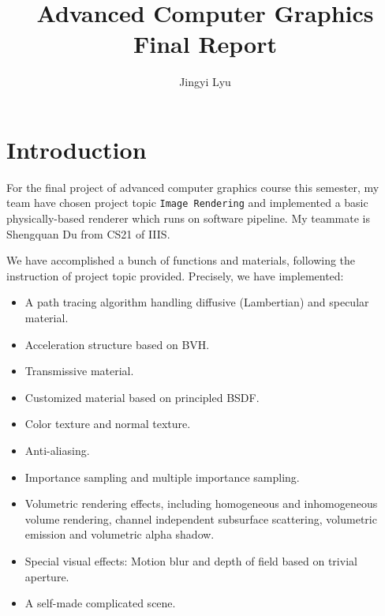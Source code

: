 \documentclass[acmtog]{acmart}
\begin{document}
\title{Advanced Computer Graphics Final Report}

\author{Jingyi Lyu}

\maketitle

\section{Introduction}
For the final project of advanced computer graphics course this semester, my team have chosen project topic \verb|Image Rendering| and implemented a basic physically-based renderer which runs on software pipeline. My teammate is Shengquan Du from CS21 of IIIS.

We have accomplished a bunch of functions and materials, following the instruction of project topic provided. Precisely, we have implemented:

\begin{itemize}
	\item A path tracing algorithm handling diffusive (Lambertian) and specular material.
	\item Acceleration structure based on BVH.
	\item Transmissive material.
	\item Customized material based on principled BSDF.
	\item Color texture and normal texture. 
	\item Anti-aliasing.
	\item Importance sampling and multiple importance sampling.
	\item Volumetric rendering effects, including homogeneous and inhomogeneous volume rendering, channel independent subsurface scattering, volumetric emission and volumetric alpha shadow. 
	\item Special visual effects: Motion blur and depth of field based on trivial aperture.
	\item A self-made complicated scene.
\end{itemize}
\end{document}
